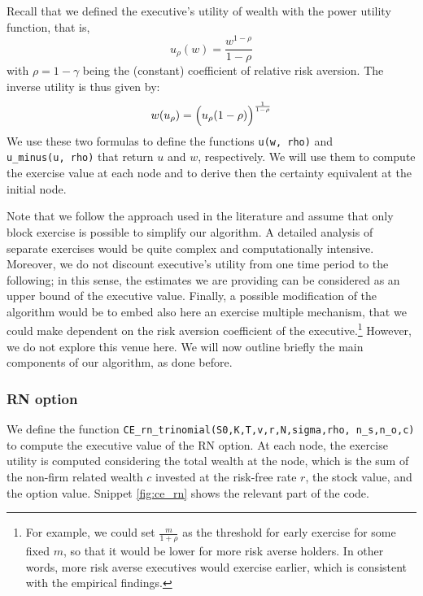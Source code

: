 Recall that we defined the executive's utility of wealth with the power utility function, that is, 
$$u_\rho(w) = \frac{w^{1-\rho}}{1-\rho}$$
with $\rho = 1 - \gamma $ being the (constant) coefficient of relative risk aversion. 
The inverse utility is thus given by:
$$w(u_\rho) = \Bigl(u_\rho(1-\rho)\Bigr)^{\frac{1}{1-\rho}}$$
We use these two formulas to define the functions \verb|u(w, rho)| and \\
\verb|u_minus(u, rho)| that return $u$ and $w$, respectively. We will use them to compute the exercise value at each node and to derive then the certainty equivalent at the initial node.


Note that we follow the approach used in the literature and assume that only block exercise is possible  to simplify our algorithm. A detailed analysis of separate exercises would be quite complex and computationally intensive. Moreover, we do not discount executive's utility from one time period to the following; in this sense, the estimates we are providing can be considered as an upper bound of the executive value.
Finally, a possible modification of the algorithm would be to embed also here an exercise multiple mechanism, that we could make dependent on the risk aversion coefficient of the executive.\footnote{For example, we could set $\frac{m}{1+\rho}$ as the threshold for early exercise for some fixed $m$, so that it would be lower for more risk averse holders. In other words, more risk averse executives would exercise earlier, which is consistent with the empirical findings.} However, we do not explore this venue here.
We will now outline briefly the main components of our algorithm, as done before.

\subsubsection{RN option}
We define the function \verb|CE_rn_trinomial(S0,K,T,v,r,N,sigma,rho, n_s,n_o,c)| to compute the executive value of the RN option. At each node, the exercise utility is computed considering the total wealth at the node, which is the sum of the non-firm related wealth $c$ invested at the risk-free rate $r$, the stock value, and the option value. Snippet \ref*{fig:ce_rn} shows the relevant part of the code.

